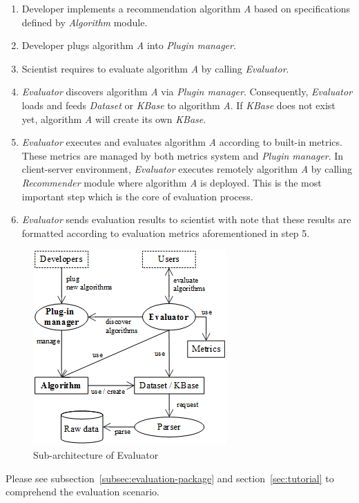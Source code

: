 \documentclass[a4paper,twoside]{article}
\begin{document}
\begin{enumerate}
\item Developer implements a recommendation algorithm \textit{A} based on specifications defined by \textit{Algorithm} module.
\item Developer plugs algorithm \textit{A} into \textit{Plugin manager}.
\item Scientist requires to evaluate algorithm \textit{A} by calling \textit{Evaluator}.
\item \textit{Evaluator} discovers algorithm \textit{A} via \textit{Plugin manager}. Consequently, \textit{Evaluator} loads and feeds \textit{Dataset} or \textit{KBase} to algorithm \textit{A}. If \textit{KBase} does not exist yet, algorithm \textit{A} will create its own \textit{KBase}.
\item \textit{Evaluator} executes and evaluates algorithm \textit{A} according to built-in metrics. These metrics are managed by both metrics system and \textit{Plugin manager}. In client-server environment, \textit{Evaluator} executes remotely algorithm \textit{A} by calling \textit{Recommender} module where algorithm \textit{A} is deployed. This is the most important step which is the core of evaluation process.
\item \textit{Evaluator} sends evaluation results to scientist with note that these results are formatted according to evaluation metrics aforementioned in step 5.
\end{enumerate}
\begin{figure}
\centering
\includegraphics{EvaluatorGeneralArchitecture.png}
\caption{Sub-architecture of Evaluator}
\label{figure:evaluator-subarchitecture}
\end{figure}
Please see subsection~\ref{subsec:evaluation-package} and section~\ref{sec:tutorial} to comprehend the evaluation scenario.
\end{document}
